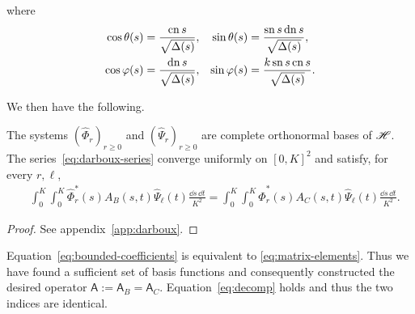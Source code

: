 where
\begin{equation}
  \begin{aligned}
    \cos\theta(s)&=\frac{\operatorname{cn} s}{\sqrt{\Delta(s)}},&
    \sin\theta(s)&=\frac{\operatorname{sn} s\operatorname{dn} s}{\sqrt{\Delta(s)}},\\
    \cos\varphi(s)&=\frac{\operatorname{dn} s}{\sqrt{\Delta(s)}},&
    \sin\varphi(s)&=\frac{k\operatorname{sn} s\operatorname{cn} s}{\sqrt{\Delta(s)}}.
  \end{aligned}
  \label{eq:half-angles}
\end{equation}

We then have the following.

\begin{proposition}\label{prop:modes}
  The systems $(\hat{\Phi}_r)_{r\geq0}$ and $(\hat{\Psi}_r)_{r\geq0}$ are
  complete orthonormal bases of $\mathscr H$. The series~\eqref{eq:darboux-series}
  converge uniformly on $[0,K]^2$ and satisfy, for every $r,\ell$,
  \begin{equation}
    \begin{aligned}
      &\int_0^K\!\int_0^K
      \hat{\Phi}^*_r(s)A_B(s,t)\hat{\Psi}_\ell(t)
      \frac{\dd s\,\dd t}{K^2}=\int_0^K\!\int_0^K
      \hat{\Phi}^*_r(s)A_C(s,t)\hat{\Psi}_\ell(t)
      \frac{\dd s\,\dd t}{K^2}.
    \end{aligned}
    \label{eq:bounded-coefficients}
  \end{equation}
\end{proposition}
\begin{proof}
  See appendix~\ref{app:darboux}.
\end{proof}

Equation~\eqref{eq:bounded-coefficients} is equivalent to
\eqref{eq:matrix-elements}. Thus we have found a sufficient set of basis
functions and consequently constructed the desired operator $\mathsf A:=\mathsf
A_B=\mathsf A_C$. Equation~\eqref{eq:decomp} holds and thus the two indices are
identical.
